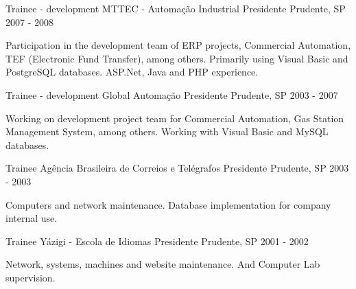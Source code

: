 \begin{cventries}
\cventry
{Trainee - development} %
{MTTEC - Automação Industrial} %
{Presidente Prudente, SP} %
{2007 - 2008} %
{
  \begin{cvitems} %
    \item {Participation in the development team of ERP projects, Commercial Automation, TEF (Electronic Fund Transfer), among others. Primarily using Visual Basic and PostgreSQL databases. ASP.Net, Java and PHP experience.}
  \end{cvitems}
}


\cventry
{Trainee - development} %
{Global Automação} %
{Presidente Prudente, SP} %
{2003 - 2007} %
{
  \begin{cvitems} %
    \item {Working on development project team for Commercial Automation, Gas Station Management System, among others. Working with Visual Basic and MySQL databases.}
  \end{cvitems}
}


\cventry
{Trainee} %
{Agência Brasileira de Correios e Telégrafos} %
{Presidente Prudente, SP} %
{2003 - 2003} %
{
  \begin{cvitems} %
    \item {Computers and network maintenance. Database implementation for company internal use.}
  \end{cvitems}
}


\cventry
{Trainee} %
{Yázigi - Escola de Idiomas} %
{Presidente Prudente, SP} %
{2001 - 2002} %
{
  \begin{cvitems} %
    \item {Network, systems, machines and website maintenance. And Computer Lab supervision.}
  \end{cvitems}
}


\end{cventries}
